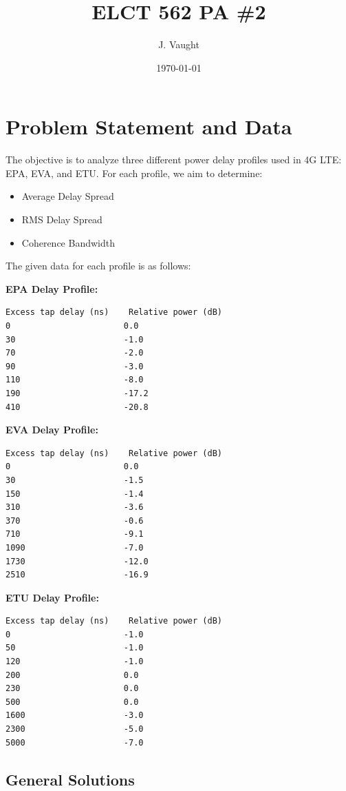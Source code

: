 \documentclass{article}
\title{ELCT 562 PA \#2}
\author{J. Vaught}
\date{\today}
\begin{document}
\maketitle

\section{Problem Statement and Data}
The objective is to analyze three different power delay profiles used in 4G LTE: EPA, EVA, and ETU. For each profile, we aim to determine:
\begin{itemize}
    \item Average Delay Spread
    \item RMS Delay Spread
    \item Coherence Bandwidth
\end{itemize}

The given data for each profile is as follows:

\textbf{EPA Delay Profile:}
\begin{verbatim}
Excess tap delay (ns)    Relative power (dB)
0                       0.0
30                      -1.0
70                      -2.0
90                      -3.0
110                     -8.0
190                     -17.2
410                     -20.8
\end{verbatim}

\textbf{EVA Delay Profile:}
\begin{verbatim}
Excess tap delay (ns)    Relative power (dB)
0                       0.0
30                      -1.5
150                     -1.4
310                     -3.6
370                     -0.6
710                     -9.1
1090                    -7.0
1730                    -12.0
2510                    -16.9
\end{verbatim}

\textbf{ETU Delay Profile:}
\begin{verbatim}
Excess tap delay (ns)    Relative power (dB)
0                       -1.0
50                      -1.0
120                     -1.0
200                     0.0
230                     0.0
500                     0.0
1600                    -3.0
2300                    -5.0
5000                    -7.0
\end{verbatim}

\subsection{General Solutions}
\end{document}

